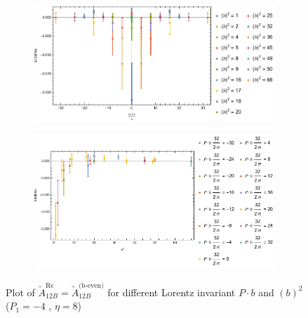 \documentclass[]{article}
\numberwithin{equation}{section}
\newcommand{\tAmp}{\widetilde{A}}
\newcommand{\tAmp}{\ensuremath{\widetilde{A}^{(+)}}}
\begin{document}
\begin{figure}[h!]
     \centering
     \begin{subfigure}[b]{0.45\textwidth}
         \centering
         \includegraphics[width=\textwidth]{Amp_plots/bP_A12B_b_even_P1_-4_eta_8.pdf}
     \end{subfigure}
     \begin{subfigure}[b]{0.45\textwidth}
         \centering
         \includegraphics[width=\textwidth]{Amp_plots/bsq_A12B_b_even_P1_-4_eta_8.pdf}
     \end{subfigure}
        \caption{Plot of $\tAmp^{\text{Re}}_{12B}=\tAmp^{\text{(b-even)}}_{12B}$ for different Lorentz invariant $P\cdot b$ and $(b)^2$  ($P_{1} = -4$ , $\eta=8$)}
\end{figure}
\pagebreak
\end{document}
